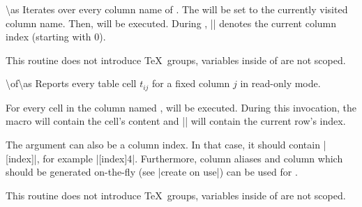 \begin{command}{\pgfplotstableforeachcolumn{}\textbackslash as}
	Iterates over every column name of . The  will be set to the currently visited column name. Then,  will be executed. During , |\pgfplotstablecol| denotes the current column index (starting with 0).
\begin{codeexample}[]
\begin{minipage}{0.8\linewidth}
\loadedtable
\pgfplotstableforeachcolumn\loadedtable\as{}
\end{minipage}
\end{codeexample}

	This routine does not introduce \TeX\ groups, variables inside of  are not scoped.
\end{command}

\begin{command}{\pgfplotstableforeachcolumnelement{}\textbackslash of\textbackslash as}
	Reports every table cell $t_{ij}$ for a fixed column $j$ in read-only mode.

	For every cell in the column named ,  will be executed. During this invocation, the macro  will contain the cell's content and |\pgfplotstablerow| will contain the current row's index.
\begin{codeexample}[]
\begin{minipage}{0.8\linewidth}
\loadedtable
{}\of\loadedtable\as{}
\end{minipage}
\end{codeexample}
	The argument  can also be a column index. In that case, it should contain |[index]|, for example |[index]4|. Furthermore, column aliases and column which should be generated on-the-fly (see |create on use|) can be used for .

	This routine does not introduce \TeX\ groups, variables inside of  are not scoped.
\end{command}

